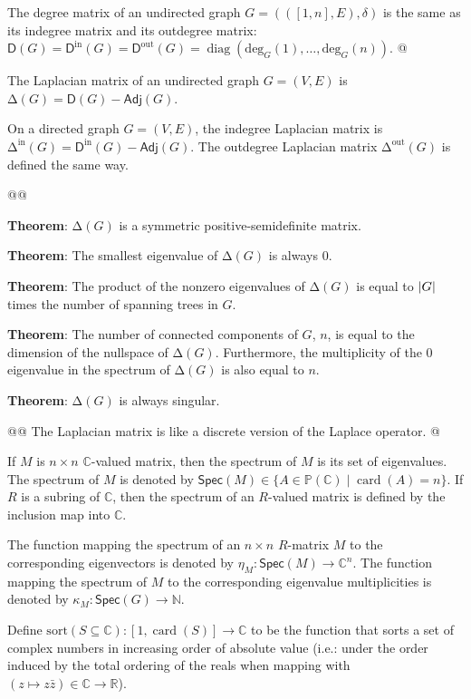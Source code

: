\documentclass[]{article}
\DeclarePairedDelimiter{\abs}{\lvert}{\rvert}
\newcommand{\textbs}[1]{{\sffamily\fontseries{sbc}\selectfont #1}}
\newcommand{\mbb}[1]{\ensuremath{\mathbb{#1}}}     %
\newcommand{\mrm}[1]{\ensuremath{\mathrm{#1}}}     %
\newcommand{\msf}[1]{\ensuremath{\mathsf{#1}}}     %
\DeclareMathOperator{\card}{card}
\newcommand{\degree}[3]{\ensuremath{\mrm{deg}_{#2}^{#1}(#3)}}
\DeclareMathOperator{\diag}{diag}
\newcommand{\define}[1]{\textbs{#1}}
\begin{document}
\begin{refsection}
\begin{easylist}[itemize]
{  The \define{degree matrix} of an undirected graph $G = (([1, n], E), \delta)$
  is the same as its indegree matrix and its outdegree matrix:
  $ \msf{D}(G)
  = \msf{D}^\mrm{in}(G)
  = \msf{D}^\mrm{out}(G)
  = \diag(\degree{}{G}{1}, \dotsc, \degree{}{G}{n})$.
}
@ {%
  The \define{Laplacian matrix} of an undirected graph $G = (V, E)$
  is $\mathrm{\Delta}(G) = \msf{D}(G) - \msf{Adj}(G)$.

  On a directed graph $G = (V, E)$, the \define{indegree Laplacian matrix}
  is $\mathrm{\Delta}^\mrm{in}(G) = \msf{D}^\mrm{in}(G) - \msf{Adj}(G)$.
  The \define{outdegree Laplacian matrix} $\mathrm{\Delta}^\mrm{out}(G)$
  is defined the same way.
}
@@ {%
  \textbf{Theorem}:
  $\mathrm{\Delta}(G)$ is a symmetric positive-semidefinite matrix.

  \textbf{Theorem}:
  The smallest eigenvalue of $\mathrm{\Delta}(G)$ is always $0$.

  \textbf{Theorem}:
  The product of the nonzero eigenvalues of $\mathrm{\Delta}(G)$ is equal to
  $\abs{G}$ times the number of spanning trees in $G$.

  \textbf{Theorem}:
  The number of connected components of $G$, $n$, is equal to the
  dimension of the nullspace of $\mathrm{\Delta}(G)$.
  Furthermore, the multiplicity of the $0$ eigenvalue in the spectrum of
  $\mathrm{\Delta}(G)$ is also equal to $n$.

  \textbf{Theorem}:
  $\mathrm{\Delta}(G)$ is always singular.
}
@@ {%
  The Laplacian matrix is like a discrete version of the Laplace operator.
}
@ {%
  If $M$ is $n \times n$ $\mbb{C}$-valued matrix, then the \define{spectrum} of
  $M$ is its set of eigenvalues. The spectrum of $M$ is denoted by
  $\msf{Spec}(M) \in \{A \in \mbb{P}(\mbb{C}) \mid \card(A) = n\}$.
  If $R$ is a subring of $\mbb{C}$, then the spectrum of an $R$-valued matrix
  is defined by the inclusion map into $\mbb{C}$.

  The function mapping the spectrum of an $n \times n$ $R$-matrix $M$
  to the corresponding eigenvectors is denoted by
  $\eta_M : \msf{Spec}(M) \to \mbb{C}^n$.
  The function mapping the spectrum of $M$ to the corresponding eigenvalue
  multiplicities is denoted by $\kappa_M : \msf{Spec}(G) \to \mbb{N}$.

  Define $\mrm{sort}(S \subseteq \mbb{C}) : [1, \card(S)] \to \mbb{C}$
  to be the function that sorts a set of complex numbers in increasing order
  of absolute value (i.e.: under the order induced by the total ordering of the
  reals when mapping with $(z \mapsto z \bar{z}) \in \mbb{C} \to \mbb{R}$).

}
\end{easylist}
\end{refsection}
\end{document}
